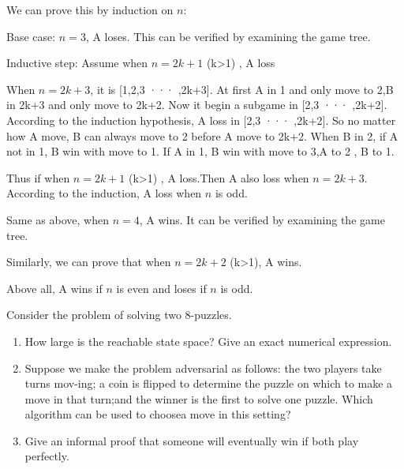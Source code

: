 \documentclass[cn,12pt]{homework}
\begin{document}
\begin{solution}
We can prove this by induction on \(n\):

Base case: \(n = 3\), A loses. This can be verified by examining the game tree.

Inductive step: Assume when \(n = 2k+1\)  (k>1) , A loss

When \(n = 2k+3\), it is [1,2,3 ··· ,2k+3]. At first A in 1 and only move to 2,B in 2k+3 and only move to 2k+2. Now it begin a subgame in [2,3 ··· ,2k+2].
According to the induction hypothesis, A loss in [2,3 ··· ,2k+2]. So no matter how A move, B can always move to 2 before A move to 2k+2. When B in 2, if A not in 1, B win with move to 1. If A in 1, B win with move to 3,A to 2 , B to 1.

Thus if when \(n = 2k+1\)  (k>1) , A loss.Then A also loss when \(n = 2k+3\). According to the induction, A loss when \(n\) is odd.

Same as above, when \(n = 4\), A wins. It can be verified by examining the game tree.

Similarly, we can prove that when \(n = 2k+2\) (k>1), A wins.

Above all, A wins if \(n\) is even and loses if \(n\) is odd.

\end{solution}


\newpage




\begin{problem}

{\selectfont Consider the problem of solving two 8-puzzles.}
\begin{enumerate}[label=\alph*)]
    \item How large is the reachable state space? Give an exact numerical expression.
    \item Suppose we make the problem adversarial as follows: the two players take turns mov-ing; a coin is flipped to determine the puzzle on which to make a move in that turn;and the winner is the first to solve one puzzle. Which algorithm can be used to choosea move in this setting?
    \item Give an informal proof that someone will eventually win if both play perfectly.
\end{enumerate}


\end{problem}
\end{document}
